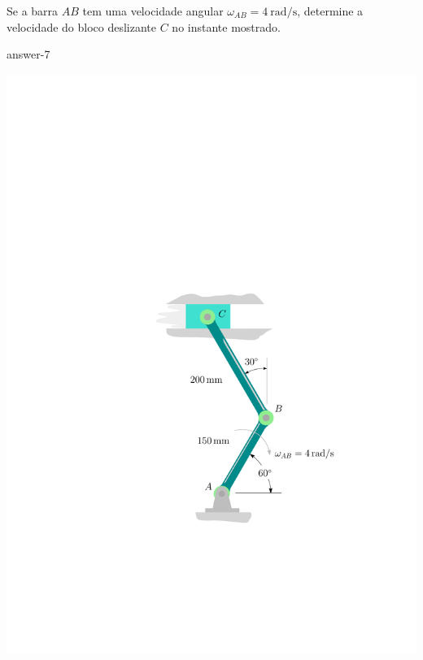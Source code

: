 \item Se a barra $AB$ tem uma velocidade angular $\omega_{AB} =\SI{4}{\radian/\second}$, determine a velocidade do bloco deslizante $C$ no instante mostrado.

{answer-7}

\begin{flushright}
	\includegraphics[scale=1]{images/draw_5}
\end{flushright}